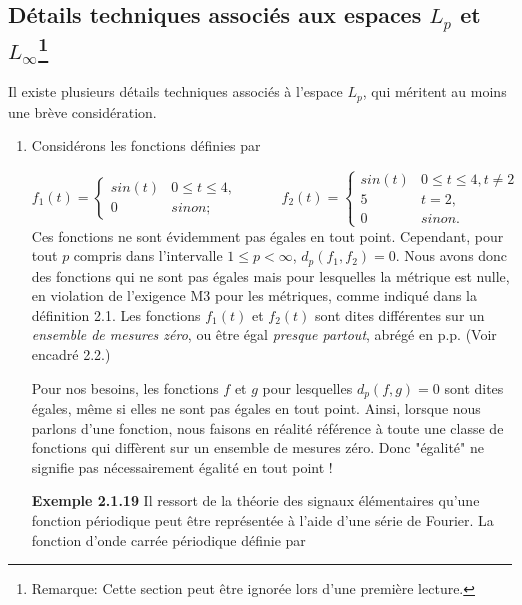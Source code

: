 \documentclass[10pt,twoside,a4paper]{book}
\begin{document}
\renewcommand*{\thefootnote}{\fnsymbol{footnote}}

\subsection{Détails techniques associés aux espaces $L_p$ et $L_\infty$\protect\footnote{Remarque: Cette section peut être ignorée lors d'une première lecture.}}

\noindent
Il existe plusieurs détails techniques associés à l'espace $L_p$, qui méritent au moins une brève considération.

\begin{enumerate}
  \item Considérons les fonctions définies par
  
  \begin{equation*}
    f_1(t) = \begin{cases} sin(t) & 0 \leq t \leq 4, \\
      0 & sinon;
          \end{cases} \quad \quad \quad
    f_2(t) = \begin{cases} sin(t) & 0 \leq t \leq 4, t \neq 2 \\
      5 & t = 2, \\
      0 & sinon.
          \end{cases}
  \end{equation*}
  \noindent
  Ces fonctions ne sont évidemment pas égales en tout point. Cependant, pour tout $p$ compris dans l'intervalle $1 \leq p < \infty$, $d_p(f_1, f_2) = 0$. Nous avons donc des fonctions qui ne sont pas égales mais pour lesquelles la métrique est nulle, en violation de l'exigence M3 pour les métriques, comme indiqué dans la définition 2.1. 
  Les fonctions $f_1(t)$ et $f_2(t)$ sont dites différentes sur un \textit{ensemble de mesures zéro}, ou être égal \textit{presque partout}, abrégé en p.p. (Voir encadré 2.2.)

  Pour nos besoins, les fonctions $f$ et $g$ pour lesquelles $d_p(f, g) = 0$ sont dites égales, même si elles ne sont pas égales en tout point. Ainsi, lorsque nous parlons d'une fonction, nous faisons en réalité référence à toute une classe de fonctions qui diffèrent sur un ensemble de mesures zéro. 
  Donc "égalité" ne signifie pas nécessairement égalité en tout point !
  \vspace{4mm}

  \noindent
  \textbf{Exemple 2.1.19} Il ressort de la théorie des signaux élémentaires qu'une fonction périodique peut être représentée à l'aide d'une série de Fourier. La fonction d'onde carrée périodique définie par


\end{enumerate}
\end{document}
